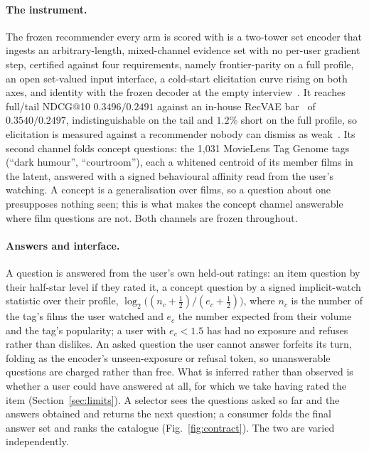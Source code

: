 \documentclass[runningheads]{llncs}
\begin{document}
\paragraph{The instrument.}
The frozen recommender every arm is scored with is a two-tower set encoder that ingests an
arbitrary-length, mixed-channel evidence set with no per-user gradient step, certified against four
requirements, namely frontier-parity on a full profile, an open set-valued input interface, a
cold-start elicitation curve rising on both axes, and identity with the frozen decoder at the empty
interview~\cite{anon_instrument}. It reaches full/tail NDCG@10 $0.3496/0.2491$ against an in-house
RecVAE bar~\cite{ren2020recvae} of $0.3540/0.2497$, indistinguishable on the tail and $1.2\%$ short on
the full profile, so elicitation is measured against a recommender nobody can dismiss as
weak~\cite{dacrema2019progress,steck2019ease}. Its second channel folds concept questions: the 1{,}031 MovieLens Tag Genome tags (``dark
humour'', ``courtroom''), each a whitened centroid of its member films in the latent, answered with a
signed behavioural affinity read from the user's watching. A concept is a generalisation over films,
so a question about one presupposes nothing seen; this is what makes the concept channel answerable
where film questions are not. Both channels are frozen throughout.

\paragraph{Answers and interface.}
A question is answered from the user's own held-out ratings: an item question by their half-star level
if they rated it, a concept question by a signed implicit-watch statistic over their profile,
$\log_2\!\big((n_c+\tfrac12)/(e_c+\tfrac12)\big)$, where $n_c$ is the number of the tag's films the
user watched and $e_c$ the number expected from their volume and the tag's popularity; a user with
$e_c<1.5$ has had no exposure and refuses rather than dislikes. An
asked question the user cannot answer forfeits its turn, folding as the encoder's unseen-exposure or
refusal token, so unanswerable questions are charged rather than free. What is inferred rather than observed is whether a user could have answered at
all, for which we take having rated the item (Section~\ref{sec:limits}). A selector sees the questions
asked so far and the answers obtained and returns the next question; a consumer folds the final answer
set and ranks the catalogue (Fig.~\ref{fig:contract}). The two are varied independently.
\end{document}
